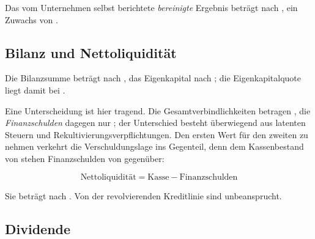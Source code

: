Das vom Unternehmen selbst berichtete \emph{bereinigte} Ergebnis betr\"agt
\MioUSDexakt{\BereinigtesErgebnis} nach
\MioUSDexakt{\BereinigtesErgebnisVJ}, ein Zuwachs von
\Pct{\BereinigtDelta}.


\subsection{Bilanz und Nettoliquidit\"at}
\label{sec:bilanz}

Die Bilanzsumme betr\"agt \MioUSDexakt{\Bilanzsumme} nach
\MioUSDexakt{\BilanzsummeVJ}, das Eigenkapital \MioUSDexakt{\Eigenkapital}
nach \MioUSDexakt{\EigenkapitalVJ}; die Eigenkapitalquote liegt damit bei
\Pct{\Eigenkapitalquote}.

Eine Unterscheidung ist hier tragend. Die Gesamtverbindlichkeiten betragen
\MioUSDexakt{\Gesamtverbindlichkeiten}, die \emph{Finanzschulden} dagegen nur
\MioUSDexakt{\Finanzschulden}; der Unterschied besteht \"uberwiegend aus
latenten Steuern und Rekultivierungsverpflichtungen. Den ersten Wert f\"ur
den zweiten zu nehmen verkehrt die Verschuldungslage ins Gegenteil, denn dem
Kassenbestand von \MioUSDexakt{\Liquiditaet} stehen Finanzschulden von
\MioUSDexakt{\Finanzschulden} gegen\"uber:

\begin{equation}
\label{eq:nettoliquiditaet}
\text{Nettoliquidit\"at} = \text{Kasse} - \text{Finanzschulden}
\end{equation}

Sie betr\"agt \MioUSDexakt{\Nettoliquiditaet} nach
\MioUSDexakt{\NettoliquiditaetVJ}. Von der revolvierenden Kreditlinie sind
\MioUSDexakt{\FazilitaetUnbeansprucht} unbeansprucht.


\subsection{Dividende}


